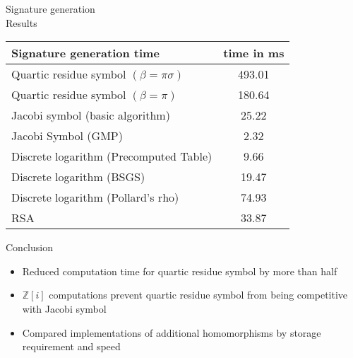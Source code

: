 \documentclass[a4, landscape, slidesonly]{seminar}
\renewcommand{\emph}[1]{{\color{emphcolor} #1}}
\newcommand{\slidetitle}[1]{{\large \color{titlecolor} #1}}
\begin{document}
\begin{slide}
\slidetitle{Signature generation}
\\[1.0cm] 
\emph{Results}
 \begin{table}[htb] 
 \begin{tabular}{|l c|} 
 \hline 
Signature generation time&  {time in ms}\\ 
 \hline  
 Quartic residue symbol $(\beta=\pi\sigma)$ & 493.01\\ 
 Quartic residue symbol $(\beta=\pi)$ & 180.64\\
 Jacobi symbol (basic algorithm) & 25.22\\ 
 Jacobi Symbol (GMP) & 2.32\\  
 Discrete logarithm (Precomputed Table) & 9.66\\ 
 Discrete logarithm (BSGS) & 19.47\\ 
 Discrete logarithm (Pollard's rho) & 74.93\\ 
 RSA & 33.87\\
 \hline 
 \end{tabular}
 \end{table}
\end{slide}
\begin{slide}
\slidetitle{Conclusion}\\[1cm]
\begin{itemize}
\item Reduced computation time for quartic residue symbol by more than half
\item $\mathbb{Z}[i]$ computations prevent quartic residue symbol from being competitive with Jacobi symbol
\item Compared implementations of additional homomorphisms by storage requirement and speed
\end{itemize}

\end{slide}
\end{document}
